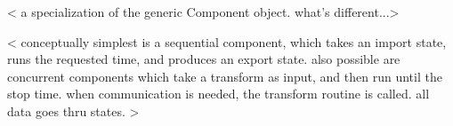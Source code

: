 %


< a specialization of the generic Component object.  what's different...>

< conceptually simplest is a sequential component, which 
takes an import state, runs the requested time, and produces
an export state.  also possible are concurrent components
which take a transform as input, and then run until the stop
time.  when communication is needed, the transform routine
is called. all data goes thru states. >
